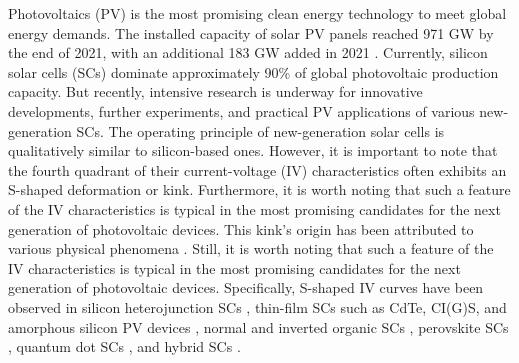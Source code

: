 \documentclass[a4paper,fleqn]{cas-dc}
\begin{document}
Photovoltaics (PV) is the most promising clean energy technology to meet global energy demands. 
The installed capacity of solar PV panels reached 971 GW by the end of 2021, with an additional 183 GW added in 2021 \cite{Divya2023}.
Currently, silicon solar cells (SCs) dominate approximately 90\% of global photovoltaic production capacity. 
But recently, intensive research is underway for innovative developments,
further experiments, and practical PV applications of various new-generation SCs.
The operating principle of new-generation solar cells is qualitatively similar to silicon-based ones.
However, it is important to note that the fourth quadrant of their current-voltage (IV) characteristics
often exhibits an S-shaped deformation or kink.
Furthermore, it is worth noting that such a feature of the IV characteristics is typical
in the most promising candidates for the next generation of photovoltaic devices.
This kink’s origin has been attributed to various physical phenomena \cite{Sesa2019,Finck2013,Romero2017,Gao2011}. 
Still, it is worth noting that such a feature of the IV characteristics is 
typical in the most promising candidates for the next generation of photovoltaic devices.
Specifically, S-shaped IV curves have been observed in silicon heterojunction SCs \cite{Saive2019},
thin-film SCs such as CdTe, CI(G)S, and amorphous silicon PV devices \cite{Saive2019,Roland2016},
normal and inverted organic SCs \cite{Gaur2014,Tran2017,Lastra2019},
perovskite SCs \cite{Saive2019,Xu2016},
quantum dot SCs \cite{Gao2011,Yu2019a},
and hybrid SCs \cite{VeinbergVidal2016,Romero2017,Finck2013}.
\end{document}
